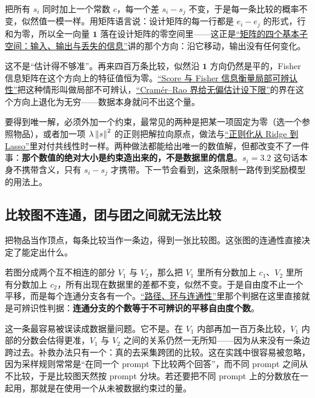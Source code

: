把所有 \(s_i\) 同时加上一个常数 \(c\)，每一个差 \(s_i-s_j\) 不变，于是每一条比较的概率不变，似然值一模一样。用矩阵语言说：设计矩阵的每一行都是 \(e_i-e_j\) 的形式，行和为零，所以全一向量 \(\mathbf{1}\) 落在设计矩阵的零空间里——这正是\hyperref[sec:03-Linear-Algebra/02-Vector-Spaces/03]{``矩阵的四个基本子空间：输入、输出与丢失的信息''}讲的那个方向：沿它移动，输出没有任何变化。

这不是``估计得不够准''。再来四百万条比较，似然沿 \(\mathbf{1}\) 方向仍然是平的，Fisher 信息矩阵在这个方向上的特征值恒为零。\hyperref[sec:11-Mathematical-Statistics/03-Sufficient-Statistics-and-Information/02]{``Score 与 Fisher 信息衡量局部可辨认性''}把这种情形叫做局部不可辨认，\hyperref[sec:11-Mathematical-Statistics/03-Sufficient-Statistics-and-Information/03]{``Cramér--Rao 界给无偏估计设下限''}的界在这个方向上退化为无穷——数据本身就问不出这个量。

要得到唯一解，必须外加一个约束，最常见的两种是把某一项固定为零（选一个参照物品），或者加一项 \(\lambda\left\lVert s\right\rVert^2\) 的正则把解拉向原点，做法与\hyperref[sec:13-Machine-Learning/02-Linear-Models/02]{``正则化从 Ridge 到 Lasso''}里对付共线性时一样。两种做法都能给出唯一的数值解，但都改变不了一件事：\textbf{那个数值的绝对大小是约束造出来的，不是数据里的信息}。\(s_i=3.2\) 这句话本身不携带含义，只有 \(s_i-s_j\) 才携带。下一节会看到，这条限制一路传到奖励模型的用法上。

\subsection{比较图不连通，团与团之间就无法比较}

把物品当作顶点，每条比较当作一条边，得到一张比较图。这张图的连通性直接决定了能定出什么。

若图分成两个互不相连的部分 \(V_1\) 与 \(V_2\)，那么把 \(V_1\) 里所有分数加上 \(c_1\)、\(V_2\) 里所有分数加上 \(c_2\)，所有出现在数据里的差都不变，似然不变。于是自由度不止一个平移，而是每个连通分支各有一个。\hyperref[sec:04-Discrete-Mathematics/03-Graph-Theory/02]{``路径、环与连通性''}里那个判据在这里直接就是可辨识性判据：\textbf{连通分支的个数等于不可辨识的平移自由度个数}。

这一条最容易被误读成数据量问题。它不是。在 \(V_1\) 内部再加一百万条比较，\(V_1\) 内部的分数会估得更准，\(V_1\) 与 \(V_2\) 之间的关系仍然一无所知——因为从来没有一条边跨过去。补救办法只有一个：真的去采集跨团的比较。这在实践中很容易被忽略，因为采样规则常常是``在同一个 prompt 下比较两个回答''，而不同 prompt 之间从不比较，于是比较图天然按 prompt 分块。若还要把不同 prompt 上的分数放在一起用，那就是在使用一个从未被数据约束过的量。

